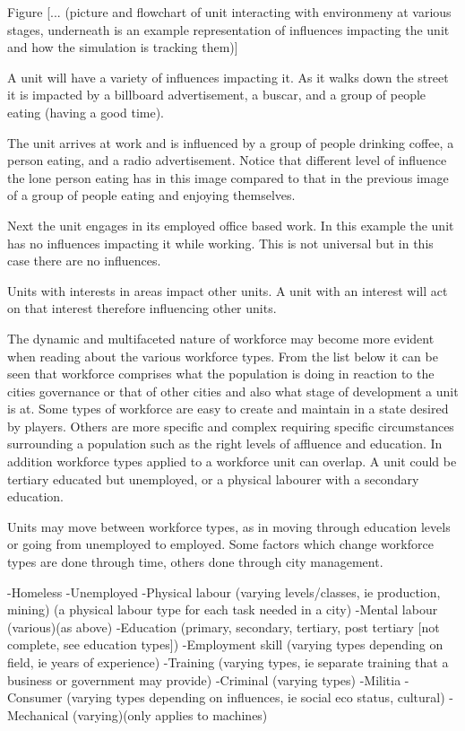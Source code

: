 Figure [... (picture and flowchart of unit interacting with environmeny at various stages, underneath is an example representation of influences impacting the unit and how the simulation is tracking them)]

A unit will have a variety of influences impacting it. As it walks down the street it is impacted by a billboard advertisement, a buscar, and a group of people eating (having a good time).

The unit arrives at work and is influenced by a group of people drinking coffee, a person eating, and a radio advertisement. Notice that different level of influence the lone person eating has in this image compared to that in the previous image of a group of people eating and enjoying themselves.

Next the unit engages in its employed office based work. In this example the unit has no influences impacting it while working. This is not universal but in this case there are no influences.



Units with interests in areas impact other units.
A unit with an interest will act on that interest therefore influencing other units.




The dynamic and multifaceted nature of workforce may become more evident when reading about the various workforce types. From the list below it can be seen that workforce comprises what the population is doing in reaction to the cities governance or that of other cities and also what stage of development a unit is at. Some types of workforce are easy to create and maintain in a state desired by players. Others are more specific and complex requiring specific circumstances surrounding a population such as the right levels of affluence and education. In addition workforce types applied to a workforce unit can overlap. A unit could be tertiary educated but unemployed, or a physical labourer with a secondary education. 

Units may move between workforce types, as in moving through education levels or going from unemployed to employed. Some factors which change workforce types are done through time, others done through city management.


-Homeless
-Unemployed
-Physical labour (varying levels/classes, ie production, mining)
	(a physical labour type for each task needed in a city) 
-Mental labour (various)(as above)
-Education (primary, secondary, tertiary, post tertiary [not complete, see education types])
-Employment skill (varying types depending on field, ie years of experience)
-Training (varying types, ie separate training that a business or government may provide)
-Criminal (varying types)
-Militia
-Consumer (varying types depending on influences, ie social eco status, cultural)
-Mechanical (varying)(only applies to machines)

